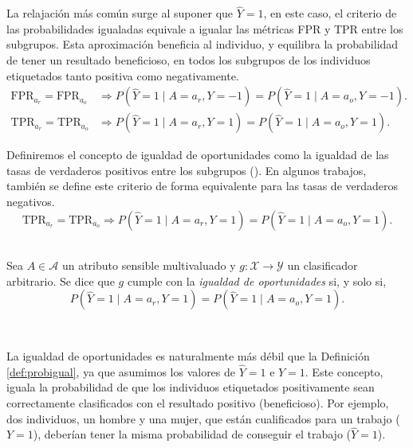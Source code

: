 \documentclass[oneside,openright,titlepage,numbers=noenddot,openany,headinclude,footinclude=true,
cleardoublepage=empty,abstractoff,BCOR=5mm,paper=a4,fontsize=12pt,main=spanish]{scrreprt}
\begin{document}
La relajación más común surge al suponer que $\hat{Y}=1$, en este caso, el criterio de las probabilidades igualadas equivale a igualar las métricas FPR y TPR entre los subgrupos. Esta aproximación beneficia al individuo, y equilibra la probabilidad de tener un resultado beneficioso, en todos los subgrupos de los individuos etiquetados tanto positiva como negativamente.
\begin{equation*}
\begin{split}
\text{FPR}_{a_r}=\text{FPR}_{a_o} &\Rightarrow P(\hat{Y}=1 \mid A=a_r,Y=-1)=P(\hat{Y}=1 \mid A=a_o, Y=-1).\\
\text{TPR}_{a_r}=\text{TPR}_{a_o} &\Rightarrow P(\hat{Y}=1 \mid A=a_r, Y=1)=P(\hat{Y}=1 \mid A=a_o, Y=1).
\end{split}
\end{equation*}

Definiremos el concepto de igualdad de oportunidades como la igualdad de las tasas de verdaderos positivos entre los subgrupos (\cite{eodd2016}). En algunos trabajos, también se define este criterio de forma equivalente para las tasas de verdaderos negativos.
\begin{equation*}
\text{TPR}_{a_r}=\text{TPR}_{a_o} \Rightarrow P(\hat{Y}= 1 \mid A=a_r, Y=1)=P(\hat{Y}= 1 \mid A=a_o, Y=1).
\end{equation*}\

\begin{definition}
Sea $A \in \mathcal{A}$ un atributo sensible multivaluado y $g\colon \mathcal{X} \to \mathcal{Y}$ un clasificador arbitrario. Se dice que $g$ cumple con la \textit{igualdad de oportunidades} si, y solo si, $$P(\hat{Y}=1 \mid A=a_r,Y=1)=P(\hat{Y}=1 \mid A=a_o, Y=1).$$
\end{definition}\

La igualdad de oportunidades es naturalmente más débil que la Definición \ref{def:probigual}, ya que asumimos los valores de $\hat{Y}=1$ e $Y=1$. Este concepto, iguala la probabilidad de que los individuos etiquetados positivamente
sean correctamente clasificados con el resultado positivo (beneficioso). Por ejemplo, dos individuos, un
hombre y una mujer, que están cualificados para un trabajo ($Y=1$), deberían tener la misma probabilidad de conseguir el trabajo ($\hat{Y}=1$).
\end{document}
